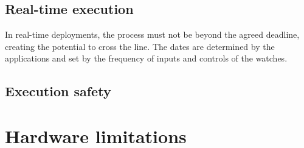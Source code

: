 \subsection{Real-time execution}
In real-time deployments, the process must not be beyond the agreed deadline, 
creating the potential to cross the line. The dates are determined by the applications and set 
by the frequency of inputs and controls of the watches.

\FloatBarrier
\subsection{Execution safety}

\FloatBarrier
\section{Hardware limitations}
